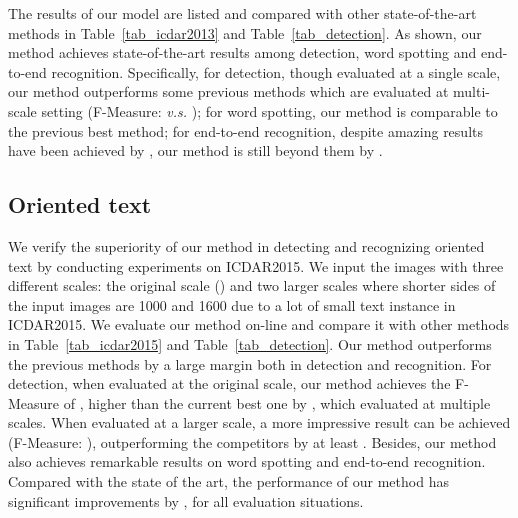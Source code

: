 \documentclass[runningheads]{llncs}
\begin{document}
The results of our model are listed and compared with other state-of-the-art methods in Table~\ref{tab_icdar2013} and Table~\ref{tab_detection}. As shown, our method achieves state-of-the-art results among detection, word spotting and end-to-end recognition. Specifically, for detection, though evaluated at a single scale, our method outperforms some previous methods which are evaluated at multi-scale setting \cite{hu2017wordsup,he2017deep} (F-Measure:   \emph{v.s.}  ); for word spotting, our method is  comparable to the previous best method; for end-to-end recognition,  despite  amazing results have been achieved by \cite{liao2017textboxes,Li_2017_ICCV}, our method is still beyond them by .

\subsection{Oriented text}
We verify the superiority of our method in detecting and recognizing oriented text by conducting experiments on ICDAR2015. We input the images with three different scales: the original scale () and two larger scales where shorter sides of the input images are 1000 and 1600 due to a lot of small text instance in ICDAR2015.  We evaluate our method on-line and compare it  with other methods in Table~\ref{tab_icdar2015} and Table~\ref{tab_detection}. Our method outperforms the previous methods by a large margin both in detection and recognition. For detection, when evaluated at the original scale, our method achieves the F-Measure of , higher than the current best one \cite{he2017deep}  by , which evaluated at multiple scales. When evaluated at a larger scale, a more impressive result can be achieved (F-Measure: ), outperforming the competitors by at least . Besides, our method also achieves remarkable results on word spotting and end-to-end recognition. Compared with the state of the art, the performance of our method has significant improvements by , for all evaluation situations.
\end{document}
